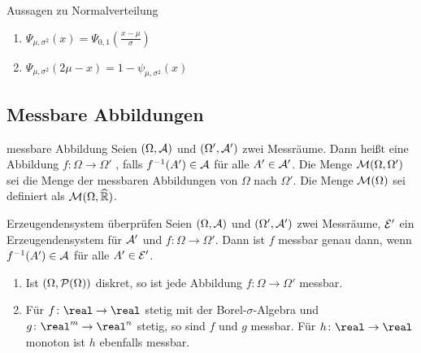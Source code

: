 \begin{Satz}{Aussagen zu Normalverteilung}
    \begin{enumerate}
        \item
        $\Psi_{\mu,\sigma^2}(x) = \Psi_{0,1}\left(\frac{x - \mu}{\sigma}\right)$

        \item
        $\Psi_{\mu,\sigma^2}(2\mu - x) = 1 - \psi_{\mu,\sigma^2}(x)$
    \end{enumerate}
\end{Satz}

\pagebreak

\subsection{%
    Messbare Abbildungen%
}

\begin{Def}{messbare Abbildung}
    Seien $(\Omega, \A)$ und $(\Omega', \A')$ zwei Messräume.
    Dann heißt eine Abbildung $f\colon \Omega \rightarrow \Omega'$ ,
    falls $f^{-1}(A') \in \A$ für alle $A' \in \A'$.
    Die Menge $\M(\Omega, \Omega')$ sei die Menge der messbaren Abbildungen von $\Omega$ nach
    $\Omega'$.
    Die Menge $\M(\Omega)$ sei definiert als $\M(\Omega, \extreal)$.
\end{Def}

\begin{Satz}{Erzeugendensystem überprüfen}
    Seien $(\Omega, \A)$ und $(\Omega', \A')$ zwei Messräume,
    $\E'$ ein Erzeugendensystem für $\A'$ und $f\colon \Omega \rightarrow \Omega'$.
    Dann ist $f$ messbar genau dann, wenn $f^{-1}(A') \in \A$ für alle $A' \in \E'$.
\end{Satz}

\begin{Bsp}
    \begin{enumerate}
        \item
        Ist $(\Omega, \P(\Omega))$ diskret, so ist jede Abbildung
        $f\colon \Omega \rightarrow \Omega'$ messbar.

        \item
        Für $f\colon \real \rightarrow \real$ stetig mit der Borel-$\sigma$-Algebra und
        $g\colon \real^m \rightarrow \real^n$ stetig, so sind $f$ und $g$ messbar.
        Für $h\colon \real \rightarrow \real$ monoton ist $h$ ebenfalls messbar.
    \end{enumerate}
\end{Bsp}

